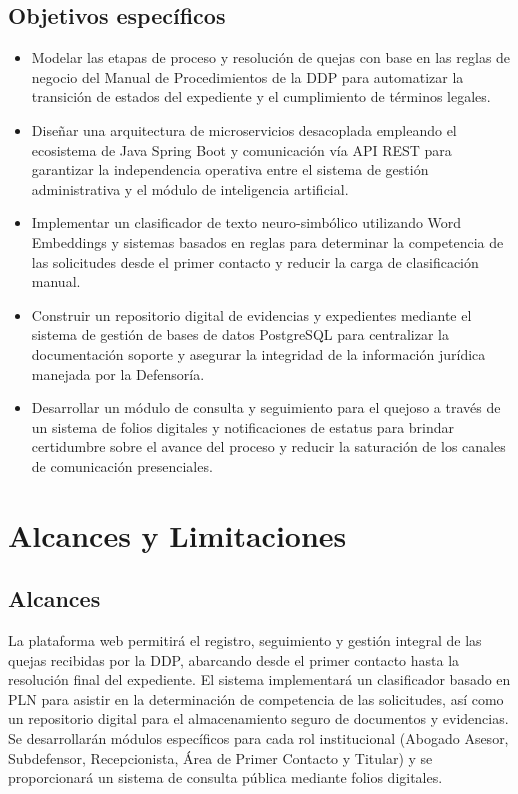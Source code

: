 \subsection{Objetivos específicos}
\begin{itemize}
    \item Modelar las etapas de proceso y resolución de quejas con base en las reglas de negocio del Manual de Procedimientos de la DDP para automatizar la transición de estados del expediente y el cumplimiento de términos legales.
    \item Diseñar una arquitectura de microservicios desacoplada empleando el ecosistema de Java Spring Boot y comunicación vía API REST para garantizar la independencia operativa entre el sistema de gestión administrativa y el módulo de inteligencia artificial.
    \item Implementar un clasificador de texto neuro-simbólico utilizando Word Embeddings y sistemas basados en reglas para determinar la competencia de las solicitudes desde el primer contacto y reducir la carga de clasificación manual.
    \item Construir un repositorio digital de evidencias y expedientes mediante el sistema de gestión de bases de datos PostgreSQL para centralizar la documentación soporte y asegurar la integridad de la información jurídica manejada por la Defensoría.
    \item Desarrollar un módulo de consulta y seguimiento para el quejoso a través de un sistema de folios digitales y notificaciones de estatus para brindar certidumbre sobre el avance del proceso y reducir la saturación de los canales de comunicación presenciales.
\end{itemize}

\section{Alcances y Limitaciones}

\subsection{Alcances}
La plataforma web permitirá el registro, seguimiento y gestión integral de las quejas recibidas por la DDP, abarcando desde el primer contacto hasta la resolución final del expediente. El sistema implementará un clasificador basado en PLN para asistir en la determinación de competencia de las solicitudes, así como un repositorio digital para el almacenamiento seguro de documentos y evidencias. Se desarrollarán módulos específicos para cada rol institucional (Abogado Asesor, Subdefensor, Recepcionista, Área de Primer Contacto y Titular) y se proporcionará un sistema de consulta pública mediante folios digitales.

